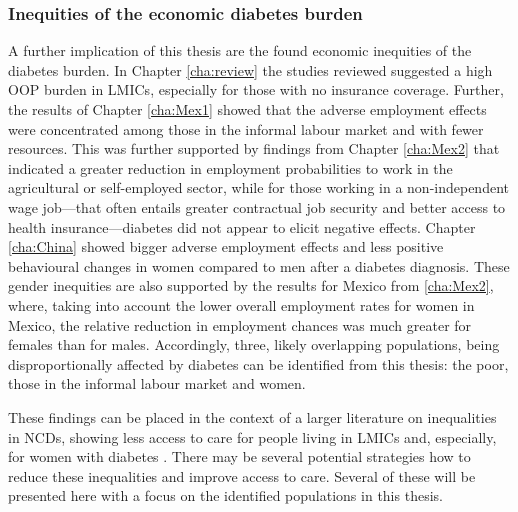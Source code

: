 \subsubsection*{Inequities of the economic diabetes burden}

A further implication of this thesis are the found economic inequities of the diabetes burden. In Chapter \ref{cha:review} the studies reviewed suggested a high \ac{OOP} burden in \acp{LMIC}, especially for those with no insurance coverage. Further, the results of Chapter \ref{cha:Mex1} showed that the adverse employment effects were concentrated among those in the informal labour market and with fewer resources. This was further supported by findings from Chapter \ref{cha:Mex2} that indicated a greater reduction in employment probabilities to work in the agricultural or self-employed sector, while for those working in a non-independent wage job---that often entails greater contractual job security and better access to health insurance---diabetes did not appear to elicit negative effects. Chapter \ref{cha:China} showed bigger adverse employment effects and less positive behavioural changes in women compared to men after a diabetes diagnosis. These gender inequities are also supported by the results for Mexico from \ref{cha:Mex2}, where, taking into account the lower overall employment rates for women in Mexico, the relative reduction in employment chances was much greater for females than for males. Accordingly, three, likely overlapping populations, being disproportionally affected by diabetes can be identified from this thesis: the poor, those in the informal labour market and women.

These findings can be placed in the context of a larger literature on inequalities in \acp{NCD}, showing less access to care for people living in \acp{LMIC} and, especially, for women with diabetes \parencite{DiCesare2013}. There may be several potential strategies how to reduce these inequalities and improve access to care. Several of these will be presented here with a focus on the identified populations in this thesis.

